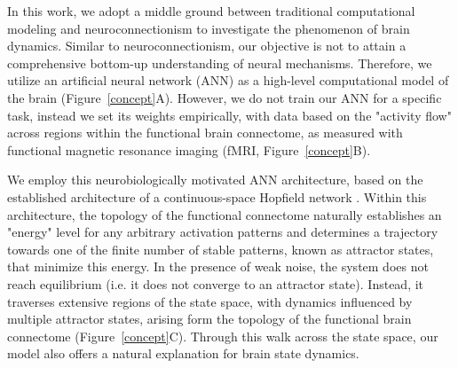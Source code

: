 \documentclass{article}
\begin{document}
In this work, we adopt a middle ground between traditional computational modeling and neuroconnectionism to investigate
the phenomenon of brain dynamics.
Similar to neuroconnectionism, our objective is not to attain a comprehensive bottom-up understanding of neural
mechanisms. Therefore, we utilize an artificial neural network (ANN) as a high-level computational model of the
brain (Figure~\ref{concept}A).
However, we do not train our ANN for a specific task, instead we set its weights empirically, with data based
on the "activity flow" \citep{cole2016activity, ito2017cognitive}
across regions within the functional brain connectome, as measured with functional magnetic resonance imaging
(fMRI, Figure~\ref{concept}B).

We employ this neurobiologically motivated ANN architecture, based on the established architecture of a continuous-space
Hopfield network \citep{hopfield1982neural, krotov2023new}.
Within this architecture, the topology of the functional connectome naturally establishes an "energy" level for any
arbitrary activation patterns and determines a trajectory towards one of the finite number of stable patterns, known as
attractor states, that minimize this energy.
In the presence of weak noise, the system does not reach equilibrium (i.e. it does not converge to an attractor state).
Instead, it traverses extensive regions of the state space, with dynamics influenced by multiple attractor states,
arising form the topology of the functional brain connectome (Figure~\ref{concept}C).
Through this walk across the state space, our model also offers a natural explanation for brain state dynamics.
\end{document}
